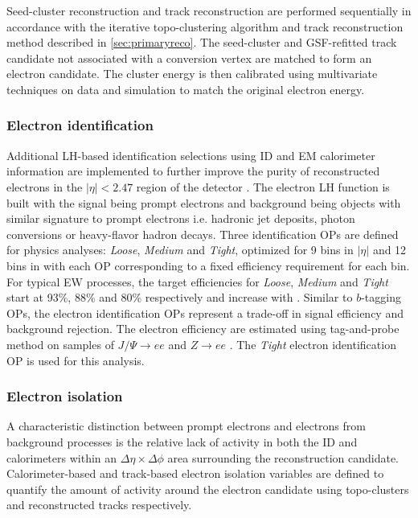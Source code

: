 \documentclass[../thesis.tex]{subfiles}
\begin{document}
Seed-cluster reconstruction and track reconstruction are performed sequentially in accordance with the iterative topo-clustering algorithm and track reconstruction method described in \autoref{sec:primaryreco}. The seed-cluster and \acs{GSF}-refitted track candidate not associated with a conversion vertex are matched to form an electron candidate. The cluster energy is then calibrated using multivariate techniques on data and simulation to match the original electron energy.

\subsubsection*{Electron identification}
Additional \acs{LH}-based identification selections using \acs{ID} and \acs{EM} calorimeter information are implemented to further improve the purity of reconstructed electrons in the $|\eta|<2.47$ region of the detector \citep{reco:electron_id}. The electron \acs{LH} function is built with the signal being prompt electrons and background being objects with similar signature to prompt electrons i.e. hadronic jet deposits, photon conversions or heavy-flavor hadron decays. Three identification \acs{OP}s are defined for physics analyses: \textit{Loose}, \textit{Medium} and \textit{Tight}, optimized for 9 bins in $|\eta|$ and 12 bins in \ET with each \acs{OP} corresponding to a fixed efficiency requirement for each bin. For typical \acs{EW} processes, the target efficiencies for \textit{Loose}, \textit{Medium} and \textit{Tight} start at 93\%, 88\% and 80\% respectively and increase with \ET. Similar to $b$-tagging \acs{OP}s, the electron identification {OP}s represent a trade-off in signal efficiency and background rejection. The electron efficiency are estimated using tag-and-probe method on samples of $J/\Psi \rightarrow ee$ and $Z \rightarrow ee$ \citep{reco:electron_id}. The \textit{Tight} electron identification \acs{OP} is used for this analysis.

\subsubsection*{Electron isolation}
\label{sec:eiso}
A characteristic distinction between prompt electrons and electrons from background processes is the relative lack of activity in both the \acs{ID} and calorimeters within an $\Delta \eta \times \Delta \phi$ area surrounding the reconstruction candidate. Calorimeter-based and track-based electron isolation variables \citep{reco:electron_id} are defined to quantify the amount of activity around the electron candidate using topo-clusters and reconstructed tracks respectively.
\end{document}
